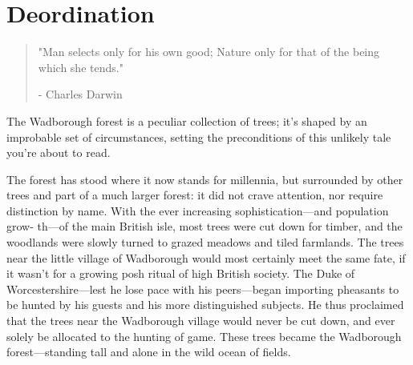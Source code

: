 
\chapter{Deordination}
\vspace{-1.3cm}
\begin{localsize}{10}
	\begin{quote}
		"Man selects only for his own good; Nature only for that of the being which she tends."
		\begin{flushright}- Charles Darwin\end{flushright}
	\end{quote} 
\end{localsize}
\vspace{1cm}

The Wadborough forest is a peculiar collection of trees; it's shaped by an improbable set of circumstances, setting the preconditions of this unlikely tale you're about to read. %

The forest has stood where it now stands for millennia, but surrounded by other trees and part of a much larger forest: it did not crave attention, nor require distinction by name. With the ever increasing sophistication---and population grow- th---of the main British isle, most trees were cut down for timber, and the woodlands were slowly turned to grazed meadows and tiled farmlands. The trees near the little village of Wadborough would most certainly meet the same fate, if it wasn't for a growing posh ritual of high British society. The Duke of Worcestershire---lest he lose pace with his peers---began importing pheasants to be hunted by his guests and his more distinguished subjects. He thus proclaimed that the trees near the Wadborough village would never be cut down, and ever solely be allocated to the hunting of game. These trees became the Wadborough forest---standing tall and alone in the wild ocean of fields.

